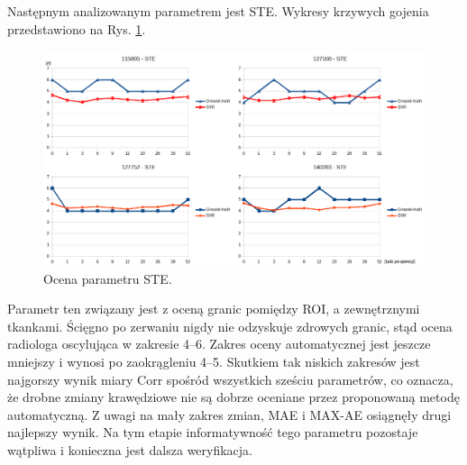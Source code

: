 Następnym analizowanym parametrem jest STE. Wykresy krzywych gojenia przedstawiono na Rys. \ref{fig:STE}.
\begin{figure}[t!]
	\centering
	\includegraphics[width=1\textwidth]{figures/STE.png}
	\caption{Ocena parametru STE.}\label{fig:STE}
\end{figure}
Parametr ten związany jest z oceną granic pomiędzy ROI, a zewnętrznymi tkankami. Ścięgno po zerwaniu nigdy nie odzyskuje zdrowych granic, stąd ocena radiologa oscylująca w zakresie 4--6. Zakres oceny automatycznej jest jeszcze mniejszy i wynosi po zaokrągleniu 4--5. Skutkiem tak niskich zakresów jest najgorszy wynik miary Corr spośród wszystkich sześciu parametrów, co oznacza, że drobne zmiany krawędziowe nie są dobrze oceniane przez proponowaną metodę automatyczną. Z uwagi na mały zakres zmian, MAE i MAX-AE osiągnęły drugi najlepszy wynik. Na tym etapie informatywność tego parametru pozostaje wątpliwa i konieczna jest dalsza weryfikacja.

